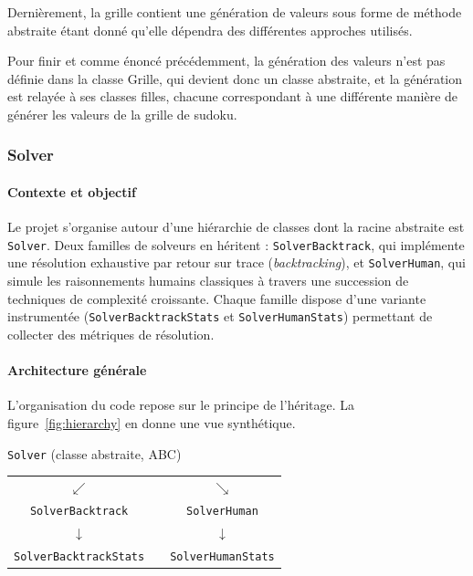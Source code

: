 \documentclass[a4paper]{article}
\begin{document}
Dernièrement, la grille contient une génération de valeurs sous forme de méthode abstraite étant donné qu’elle dépendra des différentes approches utilisés.

Pour finir et comme énoncé précédemment, la génération des valeurs n’est pas définie dans la classe Grille, qui devient donc un classe abstraite, et la génération est relayée à ses classes filles, chacune correspondant à une différente manière de générer les valeurs de la grille de sudoku.

\subsubsection{Solver}

\paragraph{Contexte et objectif}

Le projet s'organise autour d'une hiérarchie de classes dont la racine abstraite est
\texttt{Solver}. Deux familles de solveurs en héritent : \texttt{SolverBacktrack}, qui
implémente une résolution exhaustive par retour sur trace (\textit{backtracking}), et
\texttt{SolverHuman}, qui simule les raisonnements humains classiques à travers une
succession de techniques de complexité croissante. Chaque famille dispose d'une
variante instrumentée (\texttt{SolverBacktrackStats} et \texttt{SolverHumanStats}) permettant
de collecter des métriques de résolution.

\paragraph{Architecture générale}

L'organisation du code repose sur le principe de l'héritage. La figure~\ref{fig:hierarchy}
en donne une vue synthétique.

\begin{center}
\begin{tcolorbox}[infobox, title={}]
\begin{center}
\texttt{Solver} (classe abstraite, ABC)\\[4pt]
\begin{tabular}{ccc}
  $\swarrow$ & & $\searrow$ \\[2pt]
  \texttt{SolverBacktrack} & \hspace{2cm} & \texttt{SolverHuman} \\[4pt]
  $\downarrow$ & & $\downarrow$ \\[2pt]
  \texttt{SolverBacktrackStats} & & \texttt{SolverHumanStats}
\end{tabular}
\end{center}
\end{tcolorbox}
\label{fig:hierarchy}
\end{center}
\end{document}
